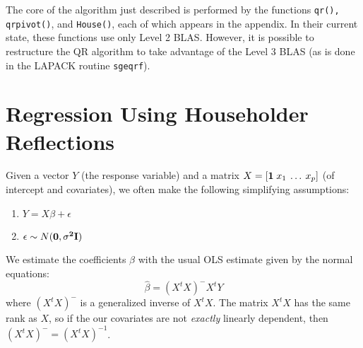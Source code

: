 \documentclass{article}
\newcommand{\EV}{\mbox{{\bf E}}}
\newcommand{\I}{\mbox{{\bf I}}}
\newcommand{\G}{\ensuremath{(X^t X)^-}}
\newcommand{\InvD}{\ensuremath{(X^t X)^{-1}}}
\begin{document}
The core of the algorithm just described is performed by the functions
{\tt qr(), qrpivot()}, and {\tt House()}, each of which appears in the
appendix.  In their current state, these functions use only Level
2 BLAS.  However, it is possible to restructure the QR algorithm to 
take advantage of the Level 3 BLAS (as is done in the LAPACK routine 
{\tt sgeqrf}).

\section{Regression Using Householder Reflections}
Given a vector $Y$ (the response variable) and a matrix 
$X=[{\bf 1} \;x_1 \: \ldots \: x_p]$ (of intercept and covariates), 
we often make the following simplifying assumptions:
%
%
\begin{enumerate}
\item $Y = X\beta + \epsilon$
\item $\epsilon \sim N(\bf{0}, \sigma^2 \I)$
\end{enumerate}
We estimate the coefficients $\beta$ with the usual OLS estimate given by
the normal equations:
\begin{equation}
\label{eqn:normal}
\hat \beta = \G X^tY
\end{equation}
where $\G$ is a generalized inverse of $X^t X$.
The matrix $X^t X$ has the same rank as $X$, so if the our covariates
are not \emph{exactly} linearly dependent, then $\G = \InvD$.
\end{document}
